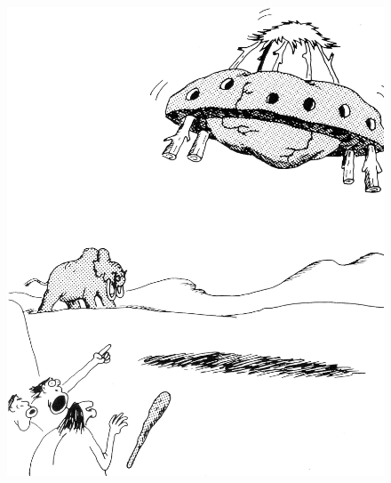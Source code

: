 \begin{figure}[!t]
 \begin{center}
  \includegraphics[width=.4\textwidth]{bilder/steinufo.jpg}
 \end{center}
\end{figure}
